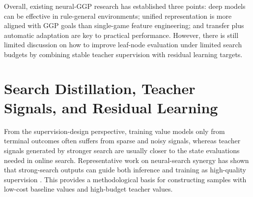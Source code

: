 
Overall, existing neural-GGP research has established three points: deep models can be effective in rule-general environments; unified representation is more aligned with GGP goals than single-game feature engineering; and transfer plus automatic adaptation are key to practical performance. However, there is still limited discussion on how to improve leaf-node evaluation under limited search budgets by combining stable teacher supervision with residual learning targets.


\section{Search Distillation, Teacher Signals, and Residual Learning}


From the supervision-design perspective, training value models only from terminal outcomes often suffers from sparse and noisy signals, whereas teacher signals generated by stronger search are usually closer to the state evaluations needed in online search. Representative work on neural-search synergy has shown that strong-search outputs can guide both inference and training as high-quality supervision \cite{anthony2017thinking,silver2018general}. This provides a methodological basis for constructing samples with low-cost baseline values and high-budget teacher values.


